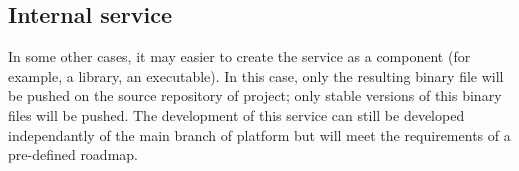 \subsection{Internal service}
\label{sec:internal-service}

In some other cases, it may easier to create the service as a component (for example, a library, an executable).
In this case, only the resulting binary file will be pushed on the source repository of \learnpad project; only stable versions of this binary files will be pushed.
The development of this service can still be developed independantly of the main branch of \learnpad platform but will meet the requirements of a pre-defined roadmap.
